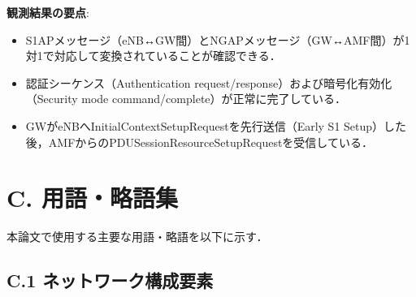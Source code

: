 \textbf{観測結果の要点}:
\begin{itemize}
  \item S1APメッセージ（eNB↔GW間）とNGAPメッセージ（GW↔AMF間）が1対1で対応して変換されていることが確認できる．
  \item 認証シーケンス（Authentication request/response）および暗号化有効化（Security mode command/complete）が正常に完了している．
  \item GWがeNBへInitialContextSetupRequestを先行送信（Early S1 Setup）した後，AMFからのPDUSessionResourceSetupRequestを受信している．
\end{itemize}

\newpage
\section*{C. 用語・略語集}

本論文で使用する主要な用語・略語を以下に示す．

\subsection*{C.1 ネットワーク構成要素}

